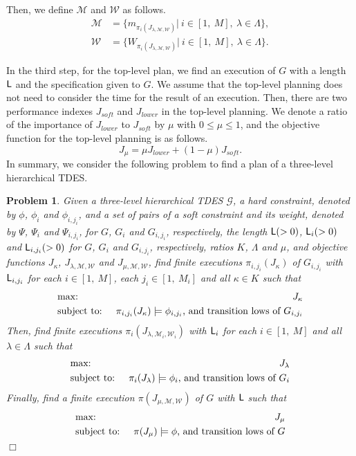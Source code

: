 \documentclass[journal,twoside,web]{IEEEtran}
\newcommand{\qedwhite}{\hfill \ensuremath{\Box}}
\newtheorem{pbm}{Problem}
\newcommand{\Len}{{\sf L}}
\newcommand{\M}{\mathcal{M}}
\newcommand{\W}{\mathcal{W}}
\begin{document}
Then, we define $\mathcal{M}$ and $\mathcal{W}$ as follows.
\begin{align}
\mathcal{M}&=\{m_{\pi_{i}(J_{\lambda,\M,\W})}|~i\in[1,~M],~\lambda\in \Lambda\},\\
\mathcal{W}&=\{W_{\pi_{i}(J_{\lambda,\M,\W})}|~i\in[1,~M],~\lambda\in \Lambda\}.
\end{align}
%

In the third step, for the top-level plan, we find an execution of $G$ with a length $\Len$ and the specification given to $G$.
We assume that the top-level planning does not need to consider the time for the result of an execution.
Then, there are two performance indexes $J_{soft}$ and $J_{lower}$ in the top-level planning.
We denote a ratio of the importance of $J_{lower}$ to $J_{soft}$ by $\mu$ with $0\leq\mu\leq1$, and the objective function for the top-level planning is as follows.
\[
J_\mu = \mu J_{lower} + (1-\mu)J_{soft}.
\]
%
In summary, we consider the following problem to find a plan of a three-level hierarchical TDES.
\begin{pbm}\label{pbm3}
Given a three-level hierarchical TDES $\mathcal{G}$, a hard constraint, denoted by $\phi$, $\phi_i$ and $\phi_{i,{j_i}}$, and a set of pairs of a soft constraint and its weight, denoted by $\Psi$, $\Psi_i$ and $\Psi_{i,{j_i}}$, for $G$, $G_i$ and $G_{i,{j_i}}$, respectively, the length $\Len(>0)$, $\Len_i(>0)$ and $\Len_{i,{j_i}}(>0)$ for $G$,  $G_i$ and $G_{i,{j_i}}$, respectively, ratios $K$, $\Lambda$ and $\mu$, and objective functions $J_\kappa$, $J_{\lambda,\M,\W}$ and $J_{\mu,\M,\W}$,
find finite executions $\pi_{i,{j_i}}(J_\kappa)$ of $G_{i,{j_i}}$ with $\Len_{i,{j_i}}$ for each $i\in[1,~M]$, each $j_i\in[1,~M_i]$ and all $\kappa\in K$ such that
\begin{eqnarray}
&\mbox{max: }&J_\kappa \notag \\
&\mbox{subject to: }&\pi_{i,{j_i}}(J_\kappa)\models \phi_{i,{j_i}}\mbox{, and transition lows of }G_{i,{j_i}}\notag 
\end{eqnarray}
Then, find finite executions $\pi_i(J_{\lambda,\M_i,\W_i})$ with $\Len_i$ for each $i\in[1,~M]$ and all $\lambda\in\Lambda$ such that
\begin{eqnarray}
&\mbox{max: }&J_{\lambda}\notag \\
&\mbox{subject to: }&\pi_i(J_{\lambda})\models \phi_i\mbox{, and transition lows of }G_i\notag 
\end{eqnarray}
Finally, find a finite execution $\pi(J_{\mu,\M,\W})$ of $G$ with $\Len$ such that
\begin{eqnarray}
&\mbox{max: }&J_{\mu}\notag \\
&\mbox{subject to: }&\pi(J_\mu)\models \phi\mbox{, and transition lows of }G\notag 
\end{eqnarray}
\qedwhite
\end{pbm}
\end{document}
